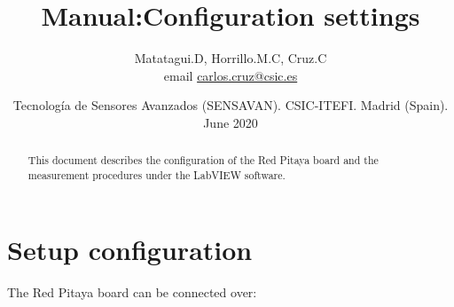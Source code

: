 \documentclass[12pt]{extarticle}
\title{Manual:Configuration settings}
\author{Matatagui.D, Horrillo.M.C, Cruz.C  \\ email \href{mailto:carlos.cruz@csic.es}{carlos.cruz@csic.es} }
\date{Tecnología de Sensores Avanzados (SENSAVAN). CSIC-ITEFI. Madrid (Spain).\\June 2020}
\begin{document}
\maketitle

\begin{abstract}
This document describes the configuration of the Red Pitaya board and the measurement procedures under the LabVIEW software.
\end{abstract}





\section{Setup configuration}
The Red Pitaya board can be connected over:
\end{document}
